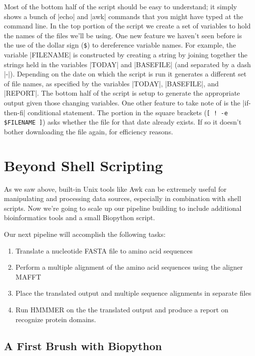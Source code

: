 Most of the bottom half of the script should be easy to understand; it simply shows a bunch of |echo| and |awk| commands that you might have typed at the command line. In the top portion of the script we create a set of variables to hold the names of the files we'll be using. One new feature we haven't seen before is the use of the dollar sign (\verb|$|) to dereference variable names.  For example, the variable |FILENAME| is constructed by creating a string by joining together the strings held in the variables |TODAY| and |BASEFILE| (and separated by a dash |-|). Depending on the date on which the script is run it generates a different set of file names, as specified by the variables |TODAY|, |BASEFILE|, and |REPORT|.  The bottom half of the script is setup to generate the appropriate output given those changing variables.  One other feature to take note of is the |if-then-fi| conditional statement. The portion in the square brackets (\verb|[ ! -e $FILENAME ]|) asks whether the file for that date already exists. If so it doesn't bother downloading the file again, for efficiency reasons.



\section{Beyond Shell Scripting}

As we saw above, built-in Unix tools like Awk can be extremely useful for manipulating and processing data sources, especially in combination with shell scripts.  Now we're going to scale up our pipeline building to include additional bioinformatics tools and a small Biopython script.

Our next pipeline will accomplish the following tasks:
%
\begin{enumerate}[noitemsep]
\item Translate a nucleotide FASTA file to amino acid sequences
\item Perform a multiple alignment of the amino acid sequences using the aligner MAFFT
\item Place the translated output and multiple sequence alignments in separate files
\item Run HMMMER on the the translated output and produce a report on recognize protein domains.
\end{enumerate}

\subsection{A First Brush with Biopython}


